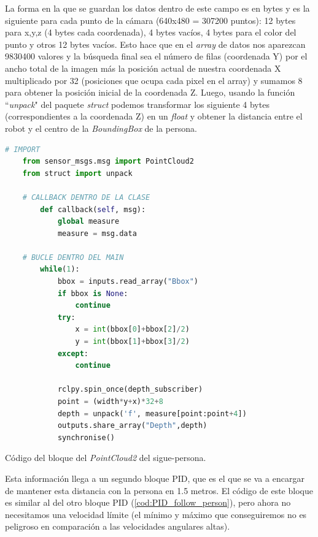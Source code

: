 La forma en la que se guardan los datos dentro de este campo es en bytes y es la siguiente para cada punto de la cámara (640x480 = 307200 puntos):
12 bytes para x,y,z (4 bytes cada coordenada), 4 bytes vacíos, 4 bytes para el color del punto y otros 12 bytes vacíos. Esto hace que en el \textit{array} de datos
nos aparezcan 9830400 valores y la búsqueda final sea el número de filas (coordenada Y) por el ancho total de la imagen más la posición actual de nuestra coordenada X
multiplicado por 32 (posiciones que ocupa cada pixel en el array) y sumamos 8 para obtener la posición inicial de la coordenada Z. Luego, usando la función
``\textit{unpack}" del paquete \textit{struct} podemos transformar los siguiente 4 bytes (correspondientes a la coordenada Z) en un \textit{float} y obtener
la distancia entre el robot y el centro de la \textit{BoundingBox} de la persona.

\begin{code}[H]
    \begin{lstlisting}[language=python]
    # IMPORT
    from sensor_msgs.msg import PointCloud2
    from struct import unpack

    # CALLBACK DENTRO DE LA CLASE
        def callback(self, msg):
            global measure
            measure = msg.data

    # BUCLE DENTRO DEL MAIN
        while(1):
            bbox = inputs.read_array("Bbox")
            if bbox is None:
                continue
            try:
                x = int(bbox[0]+bbox[2]/2)
                y = int(bbox[1]+bbox[3]/2)
            except:
                continue

            rclpy.spin_once(depth_subscriber)
            point = (width*y+x)*32+8
            depth = unpack('f', measure[point:point+4])
            outputs.share_array("Depth",depth)   
            synchronise()
    \end{lstlisting}
    \caption[Código bloque Camera-Depth sigue-persona]{Código del bloque del \textit{PointCloud2} del sigue-persona.}
    \label{cod:PC2_block_FP}
\end{code}

Esta información llega a un segundo bloque PID, que es el que se va a encargar de mantener esta distancia con la persona en 1.5 metros. El código de este bloque
es similar al del otro bloque PID (\ref{cod:PID_follow_person}), pero ahora no necesitamos una velocidad límite (el mínimo y máximo que conseguiremos no es peligroso
en comparación a las velocidades angulares altas).

